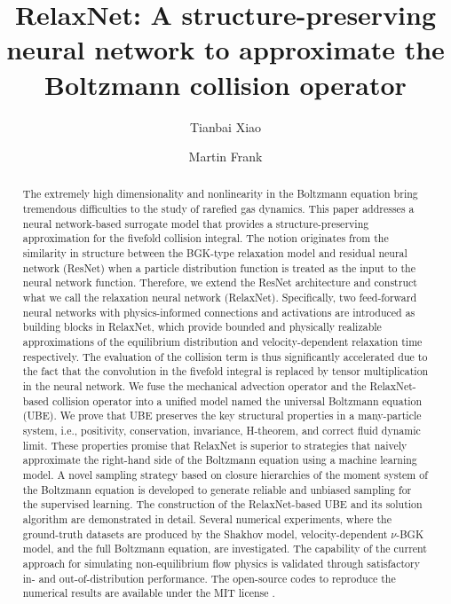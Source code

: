\documentclass[preprint,3p,12pt,sort&compress]{elsarticle}
\begin{document}
\title{RelaxNet: A structure-preserving neural network to approximate the Boltzmann collision operator}

\author{Tianbai Xiao}

\author{Martin Frank}

\address{Karlsruhe Institute of Technology, Karlsruhe, Germany}

\begin{abstract}

The extremely high dimensionality and nonlinearity in the Boltzmann equation bring tremendous difficulties to the study of rarefied gas dynamics.
This paper addresses a neural network-based surrogate model that provides a structure-preserving approximation for the fivefold collision integral.
The notion originates from the similarity in structure between the BGK-type relaxation model and residual neural network (ResNet) when a particle distribution function is treated as the input to the neural network function.
Therefore, we extend the ResNet architecture and construct what we call the relaxation neural network (RelaxNet).
Specifically, two feed-forward neural networks with physics-informed connections and activations are introduced as building blocks in RelaxNet, which provide bounded and physically realizable approximations of the equilibrium distribution and velocity-dependent relaxation time respectively.
The evaluation of the collision term is thus significantly accelerated due to the fact that the convolution in the fivefold integral is replaced by tensor multiplication in the neural network.
We fuse the mechanical advection operator and the RelaxNet-based collision operator into a unified model named the universal Boltzmann equation (UBE).
We prove that UBE preserves the key structural properties in a many-particle system, i.e., positivity, conservation, invariance, H-theorem, and correct fluid dynamic limit.
These properties promise that RelaxNet is superior to strategies that naively approximate the right-hand side of the Boltzmann equation using a machine learning model.
A novel sampling strategy based on closure hierarchies of the moment system of the Boltzmann equation is developed to generate reliable and unbiased sampling for the supervised learning.
The construction of the RelaxNet-based UBE and its solution algorithm are demonstrated in detail.
Several numerical experiments, where the ground-truth datasets are produced by the Shakhov model, velocity-dependent $\nu$-BGK model, and the full Boltzmann equation, are investigated.
The capability of the current approach for simulating non-equilibrium flow physics is validated through satisfactory in- and out-of-distribution performance.
The open-source codes to reproduce the numerical results are available under the MIT license \cite{xiao2021kinetic}.

\end{abstract}
\end{document}
